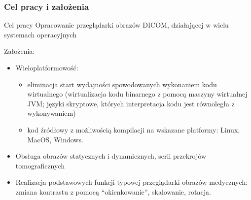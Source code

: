 \documentclass[aspectratio=169]{beamer}
\begin{document}
\begin{frame}[t]
\begin{columns}[t]
    \end{columns}
\end{frame}

\begin{frame} %
    \frametitle{Cel pracy i założenia}

    \begin{alertblock}{Cel pracy}
        Opracowanie przeglądarki obrazów DICOM, działającej w wielu systemach operacyjnych
    \end{alertblock}

    Założenia:
    \begin{itemize}
        \item Wieloplatformowość:
              \begin{itemize}
                  \item eliminacja start wydajności spowodowanych wykonaniem kodu wirtualnego (wirtualizacja kodu binarnego z pomocą maszyny wirtualnej JVM; języki skryptowe, których interpretacja kodu jest równoległa z wykonywaniem)
                  \item kod źródłowy z możliwością kompilacji na wskazane platformy: Linux, MacOS, Windows.
              \end{itemize}
        \item Obsługa obrazów statycznych i dynamicznych, serii przekrojów tomograficznych
        \item Realizacja podstawowych funkcji typowej przeglądarki obrazów medycznych: zmiana kontrastu z pomocą \enquote{okienkowanie}, skalowanie, rotacja.
    \end{itemize}

\end{frame}
\end{document}
